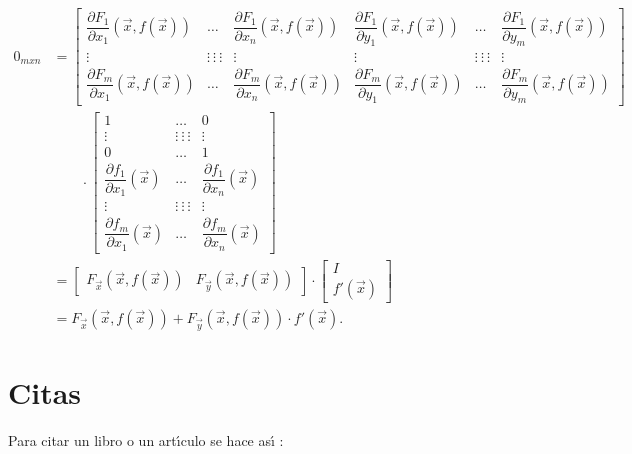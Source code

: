 \

\begin{align*}
0_{mxn} & = \begin{bmatrix} \dfrac{\partial F_1}{\partial x_1}(\vec{x},f(\vec{x})) & \dots &
\dfrac{\partial F_1}{\partial x_n}(\vec{x},f(\vec{x})) & \dfrac{\partial
F_1}{\partial y_1}(\vec{x},f(\vec{x})) & \dots & \dfrac{\partial F_1}{\partial y_m}(\vec{x},f(\vec{x})) \\
\vdots & \vdots \: \vdots \: \vdots  & \vdots & \vdots & \vdots \: \vdots \: \vdots  &
\vdots\\  \dfrac{\partial F_m}{\partial x_1}(\vec{x},f(\vec{x})) & \dots  & \dfrac{\partial
F_m}{\partial x_n}(\vec{x},f(\vec{x})) & \dfrac{\partial F_m}{\partial y_1}
(\vec{x},f(\vec{x}))& \dots & \dfrac{\partial F_m}{\partial y_m}(\vec{x},f(\vec{x}))
\end{bmatrix}\\
   & \qquad  \cdot  \begin{bmatrix}  1 & \dots & 0\\ \vdots & \vdots \: \vdots \: \vdots  &
\vdots \\ 0 & \dots & 1\\
\dfrac{\partial f_1}{\partial x_1}(\vec{x}) &  \dots  & \dfrac{\partial f_1}{\partial x_n}(\vec{x}) \\
\vdots & \vdots \: \vdots \: \vdots  &
\vdots \\
\dfrac{\partial f_m}{\partial x_1}(\vec{x}) &  \dots  & \dfrac{\partial f_m}{\partial
x_n}(\vec{x})
\end{bmatrix}
  \\
 & = \begin{bmatrix} F_{\vec{x}}(\vec{x}, f(\vec{x})) &
F_{\vec{y}}(\vec{x}, f(\vec{x})) \end{bmatrix} \cdot  \begin{bmatrix}   I \\
f'(\vec{x})
\end{bmatrix} \\
 & = F_{\vec{x}}(\vec{x},f(\vec{x})) + F_{\vec{y}}(\vec{x},f(\vec{x})) \cdot f'(\vec{x}).
\end{align*}





\section{Citas}

Para citar un libro o un art\'{\i}culo se hace as\'{\i} : \cite{ADRS} \cite{Ar}
